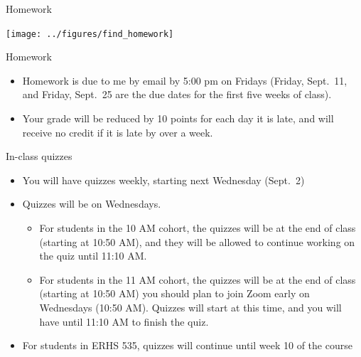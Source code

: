 \documentclass[
  10pt,
  ignorenonframetext,
]{beamer}
\providecommand{\tightlist}{%
  \setlength{\itemsep}{0pt}\setlength{\parskip}{0pt}}
\begin{document}
\begin{frame}{Homework}
\protect\hypertarget{homework-1}{}

\begin{center}\texttt{[image: ../figures/find\_homework]} \end{center}

\end{frame}

\begin{frame}{Homework}
\protect\hypertarget{homework-2}{}

\begin{itemize}
\tightlist
\item
  Homework is due to me by email by 5:00 pm on Fridays (Friday,
  Sept.~11, and Friday, Sept.~25 are the due dates for the first five
  weeks of class).
\item
  Your grade will be reduced by 10 points for each day it is late, and
  will receive no credit if it is late by over a week.
\end{itemize}

\end{frame}

\begin{frame}{In-class quizzes}
\protect\hypertarget{in-class-quizzes}{}

\begin{itemize}
\tightlist
\item
  You will have quizzes weekly, starting next Wednesday (Sept.~2)
\item
  Quizzes will be on Wednesdays.

  \begin{itemize}
  \tightlist
  \item
    For students in the 10 AM cohort, the quizzes will be at the end of
    class (starting at 10:50 AM), and they will be allowed to continue
    working on the quiz until 11:10 AM.
  \item
    For students in the 11 AM cohort, the quizzes will be at the end of
    class (starting at 10:50 AM) you should plan to join Zoom early on
    Wednesdays (10:50 AM). Quizzes will start at this time, and you will
    have until 11:10 AM to finish the quiz.
  \end{itemize}
\item
  For students in ERHS 535, quizzes will continue until week 10 of the
  course
\end{itemize}

\end{frame}
\end{document}
